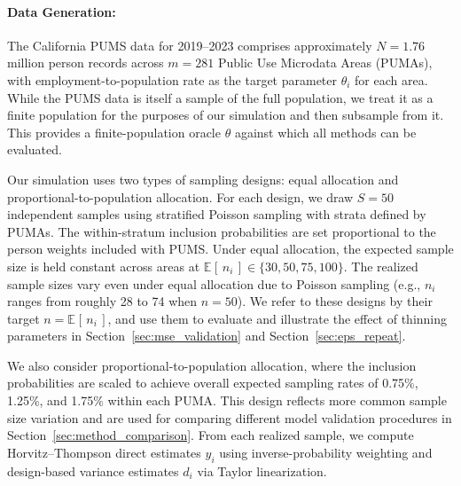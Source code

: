 \documentclass[11pt]{article}
\newcommand{\E}[2][]{\mathbb{E}_{#1}\!\left[\,#2\,\right]}
\theoremstyle{plain}
\theoremstyle{definition}
\theoremstyle{remark}
\begin{document}
\paragraph{Data Generation:} The California PUMS data for 2019--2023 comprises approximately $N = 1.76$ million person records across $m = 281$ Public Use Microdata Areas (PUMAs), with employment-to-population rate as the target parameter $\theta_i$ for each area. While the PUMS data is itself a sample of the full population, we treat it as a finite population for the purposes of our simulation and then subsample from it. This provides a finite-population oracle $\theta$ against which all methods can be evaluated.

Our simulation uses two types of sampling designs: equal allocation and proportional-to-population allocation. For each design, we draw $S = 50$ independent samples using stratified Poisson sampling with strata defined by PUMAs.  The within-stratum inclusion probabilities are set proportional to the person weights included with PUMS. Under equal allocation, the expected sample size is held constant across areas at $\E{n_i} \in \{30, 50, 75, 100\}$. The realized sample sizes vary even under equal allocation due to Poisson sampling (e.g., $n_i$ ranges from roughly 28 to 74 when $n = 50$). We refer to these designs by their target $n = \E{n_i}$, and use them to evaluate and illustrate the effect of thinning parameters in Section~\ref{sec:mse_validation} and Section~\ref{sec:eps_repeat}.

We also consider proportional-to-population allocation, where the inclusion probabilities are scaled to achieve overall expected sampling rates of 0.75\%, 1.25\%, and 1.75\% within each PUMA. This design reflects more common sample size variation and are used for comparing different model validation procedures in Section~\ref{sec:method_comparison}.
From each realized sample, we compute Horvitz--Thompson direct estimates $y_i$ using inverse-probability weighting and design-based variance estimates $d_i$ via Taylor linearization.
\end{document}
